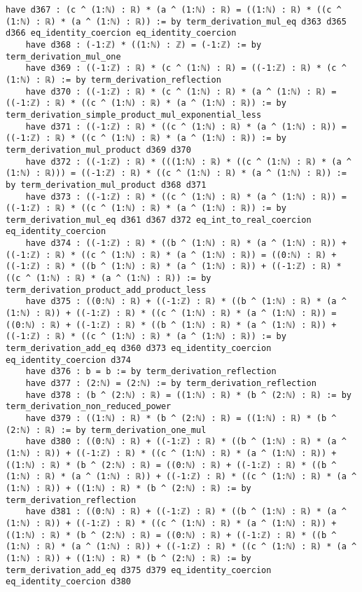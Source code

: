 \documentclass{article}
\begin{document}
\begin{tcolorbox}[colback=white!10, width=\linewidth]
\begin{lstlisting}[language=Lean4]
    have d367 : (c ^ (1:ℕ) : ℝ) * (a ^ (1:ℕ) : ℝ) = ((1:ℕ) : ℝ) * ((c ^ (1:ℕ) : ℝ) * (a ^ (1:ℕ) : ℝ)) := by term_derivation_mul_eq d363 d365 d366 eq_identity_coercion eq_identity_coercion
    have d368 : (-1:ℤ) * ((1:ℕ) : ℤ) = (-1:ℤ) := by term_derivation_mul_one
    have d369 : ((-1:ℤ) : ℝ) * (c ^ (1:ℕ) : ℝ) = ((-1:ℤ) : ℝ) * (c ^ (1:ℕ) : ℝ) := by term_derivation_reflection
    have d370 : ((-1:ℤ) : ℝ) * (c ^ (1:ℕ) : ℝ) * (a ^ (1:ℕ) : ℝ) = ((-1:ℤ) : ℝ) * ((c ^ (1:ℕ) : ℝ) * (a ^ (1:ℕ) : ℝ)) := by term_derivation_simple_product_mul_exponential_less
    have d371 : ((-1:ℤ) : ℝ) * ((c ^ (1:ℕ) : ℝ) * (a ^ (1:ℕ) : ℝ)) = ((-1:ℤ) : ℝ) * ((c ^ (1:ℕ) : ℝ) * (a ^ (1:ℕ) : ℝ)) := by term_derivation_mul_product d369 d370
    have d372 : ((-1:ℤ) : ℝ) * (((1:ℕ) : ℝ) * ((c ^ (1:ℕ) : ℝ) * (a ^ (1:ℕ) : ℝ))) = ((-1:ℤ) : ℝ) * ((c ^ (1:ℕ) : ℝ) * (a ^ (1:ℕ) : ℝ)) := by term_derivation_mul_product d368 d371
    have d373 : ((-1:ℤ) : ℝ) * ((c ^ (1:ℕ) : ℝ) * (a ^ (1:ℕ) : ℝ)) = ((-1:ℤ) : ℝ) * ((c ^ (1:ℕ) : ℝ) * (a ^ (1:ℕ) : ℝ)) := by term_derivation_mul_eq d361 d367 d372 eq_int_to_real_coercion eq_identity_coercion
    have d374 : ((-1:ℤ) : ℝ) * ((b ^ (1:ℕ) : ℝ) * (a ^ (1:ℕ) : ℝ)) + ((-1:ℤ) : ℝ) * ((c ^ (1:ℕ) : ℝ) * (a ^ (1:ℕ) : ℝ)) = ((0:ℕ) : ℝ) + ((-1:ℤ) : ℝ) * ((b ^ (1:ℕ) : ℝ) * (a ^ (1:ℕ) : ℝ)) + ((-1:ℤ) : ℝ) * ((c ^ (1:ℕ) : ℝ) * (a ^ (1:ℕ) : ℝ)) := by term_derivation_product_add_product_less
    have d375 : ((0:ℕ) : ℝ) + ((-1:ℤ) : ℝ) * ((b ^ (1:ℕ) : ℝ) * (a ^ (1:ℕ) : ℝ)) + ((-1:ℤ) : ℝ) * ((c ^ (1:ℕ) : ℝ) * (a ^ (1:ℕ) : ℝ)) = ((0:ℕ) : ℝ) + ((-1:ℤ) : ℝ) * ((b ^ (1:ℕ) : ℝ) * (a ^ (1:ℕ) : ℝ)) + ((-1:ℤ) : ℝ) * ((c ^ (1:ℕ) : ℝ) * (a ^ (1:ℕ) : ℝ)) := by term_derivation_add_eq d360 d373 eq_identity_coercion eq_identity_coercion d374
    have d376 : b = b := by term_derivation_reflection
    have d377 : (2:ℕ) = (2:ℕ) := by term_derivation_reflection
    have d378 : (b ^ (2:ℕ) : ℝ) = ((1:ℕ) : ℝ) * (b ^ (2:ℕ) : ℝ) := by term_derivation_non_reduced_power
    have d379 : ((1:ℕ) : ℝ) * (b ^ (2:ℕ) : ℝ) = ((1:ℕ) : ℝ) * (b ^ (2:ℕ) : ℝ) := by term_derivation_one_mul
    have d380 : ((0:ℕ) : ℝ) + ((-1:ℤ) : ℝ) * ((b ^ (1:ℕ) : ℝ) * (a ^ (1:ℕ) : ℝ)) + ((-1:ℤ) : ℝ) * ((c ^ (1:ℕ) : ℝ) * (a ^ (1:ℕ) : ℝ)) + ((1:ℕ) : ℝ) * (b ^ (2:ℕ) : ℝ) = ((0:ℕ) : ℝ) + ((-1:ℤ) : ℝ) * ((b ^ (1:ℕ) : ℝ) * (a ^ (1:ℕ) : ℝ)) + ((-1:ℤ) : ℝ) * ((c ^ (1:ℕ) : ℝ) * (a ^ (1:ℕ) : ℝ)) + ((1:ℕ) : ℝ) * (b ^ (2:ℕ) : ℝ) := by term_derivation_reflection
    have d381 : ((0:ℕ) : ℝ) + ((-1:ℤ) : ℝ) * ((b ^ (1:ℕ) : ℝ) * (a ^ (1:ℕ) : ℝ)) + ((-1:ℤ) : ℝ) * ((c ^ (1:ℕ) : ℝ) * (a ^ (1:ℕ) : ℝ)) + ((1:ℕ) : ℝ) * (b ^ (2:ℕ) : ℝ) = ((0:ℕ) : ℝ) + ((-1:ℤ) : ℝ) * ((b ^ (1:ℕ) : ℝ) * (a ^ (1:ℕ) : ℝ)) + ((-1:ℤ) : ℝ) * ((c ^ (1:ℕ) : ℝ) * (a ^ (1:ℕ) : ℝ)) + ((1:ℕ) : ℝ) * (b ^ (2:ℕ) : ℝ) := by term_derivation_add_eq d375 d379 eq_identity_coercion eq_identity_coercion d380

\end{lstlisting}
\end{tcolorbox}
\end{document}
